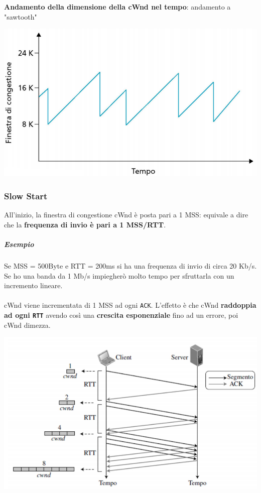 \documentclass[10pt]{article}
\begin{document}
\pagebreak
\textbf{Andamento della dimensione della cWnd nel tempo}: andamento a "sawtooth"
\begin{center}
\includegraphics[scale=0.65]{cwndgraph.png}
\end{center}
\subsubsection{Slow Start}
All'inizio, la finestra di congestione cWnd è posta pari a 1 MSS: equivale a dire che la \textbf{frequenza di invio è pari a 1 MSS/RTT}.
\subparagraph{Esempio} Se MSS = 500Byte e RTT = 200ms si ha una frequenza di invio di circa 20 Kb/s. Se ho una banda da 1 Mb/s impiegherò molto tempo per sfruttarla con un incremento lineare.\\\\
cWnd viene incrementata di 1 MSS ad ogni \texttt{ACK}. L'effetto è che cWnd \textbf{raddoppia ad ogni \texttt{RTT}} avendo così una \textbf{crescita esponenziale} fino ad un errore, poi cWnd dimezza.
\begin{center}
\includegraphics[scale=0.7]{slowstartgraph.png}
\end{center}
\pagebreak
\end{document}
